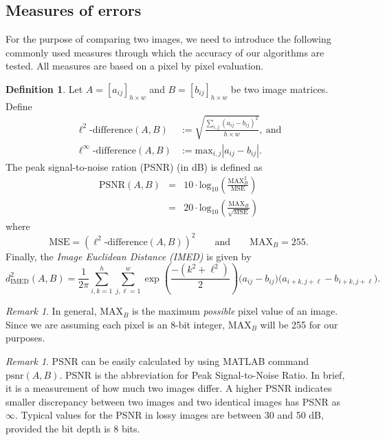 \documentclass[12pt]{amsart}
\theoremstyle{definition}
\newtheorem{defn}[thm]{Definition}
\theoremstyle{remark}
\newtheorem{rem}[thm]{Remark}
\numberwithin{thm}{section}
\begin{document}
\subsection{Measures of errors}\label{subsect:measures}
For the purpose of comparing two images, we need to introduce the following commonly used measures through which the accuracy of our algorithms are tested. All measures are based on a pixel by pixel evaluation. 
\begin{defn}
Let $A=[a_{ij}]_{h\times w}$ and $B=[b_{ij}]_{h\times w}$ be two image matrices. %
Define
\begin{align*}
\ell^2\text{-difference}(A,B) &:= \sqrt{ \frac{ \sum_{i,j} \left( a_{ij} - b_{ij} \right)^2} {h \times w}},\ \textrm{and}\\
\ell^\infty\text{-difference}(A,B) &:= \textrm{max}_{i,j} \left \vert a_{ij} - b_{ij} \right\vert.
\end{align*}
The peak signal-to-noise ration (PSNR) \cite{HG08} (in dB) is defined as
\begin{displaymath}
\begin{array}{ccl}
\textrm{PSNR}(A,B) & = & 10\cdot \textrm{log}_{10} \left( \frac{\textrm{MAX}_B^2}{\textrm{MSE}} \right)\\
		 & = & 20 \cdot \textrm{log}_{10} \left( \frac{\textrm{MAX}_B}{\sqrt{\textrm{MSE}}} \right)
\end{array}
\end{displaymath}
where
\begin{displaymath}
\textrm{MSE} = (\ell^2\text{-difference}(A,B))^2 \qquad \textrm{and} \qquad \textrm{MAX}_B= 255.
\end{displaymath}
Finally, the \emph{Image Euclidean Distance (IMED)} is given by
\[d_\text{IMED}^2(A,B) = \frac{1}{2\pi}\sum_{i,k = 1}^h\sum_{j,\ell = 1}^w \exp\left(\frac{-(k^2+\ell^2)}{2}\right)\big(a_{ij}-b_{ij}\big)\big(a_{i+k,j+\ell} - b_{i+k,j+\ell}\big).\]
\end{defn}

\begin{rem}
In general, $\text{MAX}_B$ is the maximum \emph{possible} pixel value of an image. Since we are assuming each pixel is an 8-bit integer, $\text{MAX}_B$ will be 255 for our purposes.
\end{rem}

\begin{rem}
PSNR can be easily calculated by using MATLAB command $\textrm{psnr}(A,B)$.
PSNR is the abbreviation for Peak Signal-to-Noise Ratio. In brief, it is a measurement of how much two images differ. A higher PSNR indicates smaller discrepancy between two images and two identical images has PSNR as $\infty$. Typical values for the PSNR in lossy images are between 30 and 50 dB, provided the bit depth is 8 bits. 
\end{rem}
\end{document}
